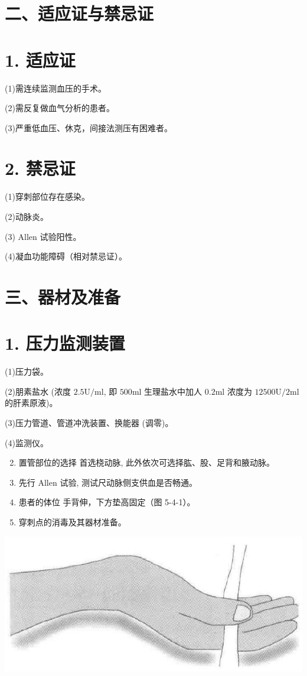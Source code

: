 \documentclass[10pt]{article}
\begin{document}
\section*{二、适应证与禁忌证}
\section*{1. 适应证}
(1)需连续监测血压的手术。

(2)需反复做血气分析的患者。

(3)严重低血压、休克，间接法测压有困难者。

\section*{2. 禁忌证}
(1)穿刺部位存在感染。

(2)动脉炎。

(3) Allen 试验阳性。

(4)凝血功能障碍（相对禁忌证）。

\section*{三、器材及准备}
\section*{1. 压力监测装置}
(1)压力袋。

(2)朋素盐水 (浓度 $2.5 \mathrm{U} / \mathrm{ml}$, 即 $500 \mathrm{ml}$ 生理盐水中加人 $0.2 \mathrm{ml}$ 浓度为 $12500 \mathrm{U} / 2 \mathrm{ml}$ 的肝素原液)。

(3)压力管道、管道冲洗装置、换能器 (调零)。

(4)监测仪。

\begin{enumerate}
  \setcounter{enumi}{1}
  \item 置管部位的选择 首选桡动脉, 此外依次可选择肱、股、足背和腋动脉。

  \item 先行 Allen 试验, 测试尺动脉侧支供血是否畅通。

  \item 患者的体位 手背伸，下方垫高固定（图 5-4-1）。

  \item 穿刺点的消毒及其器材准备。

\end{enumerate}

\begin{center}
\includegraphics[max width=\textwidth]{2024_07_05_645bb794a4d4f32ee0c8g-297}
\end{center}
\end{document}
